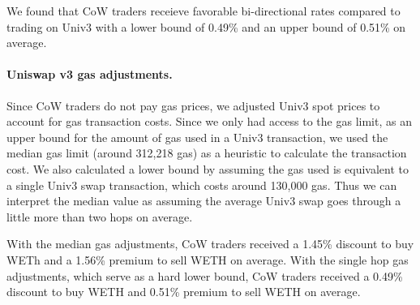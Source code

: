 \documentclass[a4paper,10pt]{article}
\theoremstyle{remark}
\begin{document}
We found that CoW traders receieve favorable bi-directional rates compared to trading on Univ3 with a lower bound of 0.49\% and an upper bound of 0.51\% on average. 

\paragraph{Uniswap v3 gas adjustments.}
Since CoW traders do not pay gas prices, we adjusted Univ3 spot prices to account for gas transaction costs.
%
Since we only had access to the gas limit, as an upper bound for the amount of gas used in a Univ3 transaction, we used the median gas limit (around 312,218 gas) as a heuristic to calculate the transaction cost. 
%
We also calculated a lower bound by assuming the gas used is equivalent to a single Univ3 swap transaction, which costs around 130,000 gas. 
%
Thus we can interpret the median value as assuming the average Univ3 swap goes through a little more than two hops on average.

With the median gas adjustments, CoW traders received a 1.45\% discount to buy WETh and a 1.56\% premium to sell WETH on average.
With the single hop gas adjustments, which serve as a hard lower bound, CoW traders received a 0.49\% discount to buy WETH and 0.51\% premium to sell WETH on average.
\end{document}
